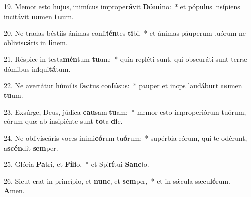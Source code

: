 19. Memor esto hujus, inimícus imprope\textbf{rá}vit \textbf{Dó}\textbf{mi}no:~*  et pópulus insípiens incitávit \textbf{no}men \textbf{tu}um.\

20. Ne tradas béstiis ánimas confi\textbf{tén}tes \textbf{ti}bi,~*  et ánimas páuperum tuórum ne oblivis\textbf{cá}ris in \textbf{fi}nem.\

21. Réspice in testa\textbf{mén}tum \textbf{tu}um:~*  quia repléti sunt, qui obscuráti sunt terræ dómibus in\textbf{i}qui\textbf{tá}tum.\

22. Ne avertátur húmilis \textbf{fac}tus con\textbf{fú}sus:~*  pauper et inops laudábunt \textbf{no}men \textbf{tu}um.\

23. Exsúrge, Deus, júdica \textbf{cau}sam \textbf{tu}am:~*  memor esto improperiórum tuórum, eórum quæ ab insipiénte sunt \textbf{to}ta \textbf{di}e.\

24. Ne obliviscáris voces inimi\textbf{có}rum tu\textbf{ó}rum:~*  supérbia eórum, qui te odérunt, a\textbf{scén}dit \textbf{sem}per.\

25. Glória \textbf{Pa}tri, et \textbf{Fí}\textbf{li}o,~*  et Spi\textbf{rí}tui \textbf{Sanc}to.\

26. Sicut erat in princípio, et \textbf{nunc}, et \textbf{sem}per,~*  et in sǽcula sæcu\textbf{ló}rum. \textbf{A}men.\

